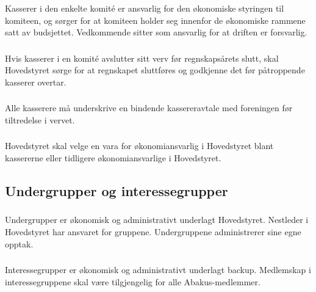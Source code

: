 \subsubsection{}
Kasserer i den enkelte komité er ansvarlig for den økonomiske styringen til
komiteen, og sørger for at komiteen holder seg innenfor de økonomiske rammene satt av budsjettet.
Vedkommende sitter som ansvarlig for at driften er forsvarlig.

\subsubsection{}
Hvis kasserer i en komité avslutter sitt verv før regnskapsårets slutt, skal Hovedstyret sørge for at regnskapet sluttføres og godkjenne det før påtroppende kasserer overtar.

\subsubsection{}
Alle kasserere må underskrive en bindende kassereravtale med foreningen før tiltredelse i vervet.

\subsubsection{}
Hovedstyret skal velge en vara for økonomiansvarlig i Hovedstyret blant kassererne eller tidligere økonomiansvarlige i Hovedstyret.

\subsection{Undergrupper og interessegrupper}

\subsubsection{}
Undergrupper er økonomisk og administrativt underlagt Hovedstyret. Nestleder i
Hovedstyret har ansvaret for gruppene. Undergruppene administrerer sine egne
opptak.

\subsubsection{}
Interessegrupper er økonomisk og administrativt underlagt backup. Medlemskap i
interessegruppene skal være tilgjengelig for alle Abakus-medlemmer.

